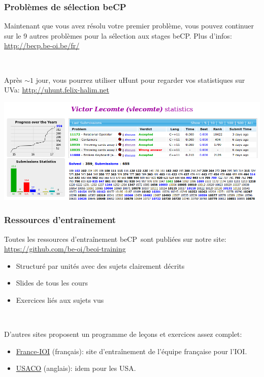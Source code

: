 \documentclass[12pt]{beamer}
\newcommand{\urlb}[1]{{\color{linkblue}\url{#1}}}
\newcommand{\hrefb}[2]{{\color{linkblue}\href{#1}{#2}}}
\begin{document}
\begin{frame}
\frametitle{Problèmes de sélection beCP}
Maintenant que vous avez résolu votre premier problème, vous pouvez continuer sur le 9 autres problèmes pour la sélection aux stages beCP. Plus d'infos: \urlb{http://becp.be-oi.be/fr/}

~

Après $\sim 1$ jour, vous pourrez utiliser uHunt pour regarder vos statistiques sur UVa: \urlb{http://uhunt.felix-halim.net}
\begin{center}
\includegraphics[height=0.3\linewidth]{img/uhunt}
\end{center}
\end{frame}

\begin{frame}
\frametitle{Ressources d'entraînement}
Toutes les ressources d'entraînement beCP sont publiées sur notre site: \urlb{https://github.com/be-oi/beoi-training}
\begin{itemize}
\item Structuré par unités avec des sujets clairement décrits
\item Slides de tous les cours
\item Exercices liés aux sujets vus
\end{itemize}

~

D'autres sites proposent un programme de leçons et exercices assez complet:
\begin{itemize}
\item \hrefb{http://www.france-ioi.org}{France-IOI} (français): site d'entraînement de l'équipe française pour l'IOI.
\item \hrefb{http://train.usaco.org/usacogate}{USACO} (anglais): idem pour les USA.
\end{itemize}
\end{frame}
\end{document}
